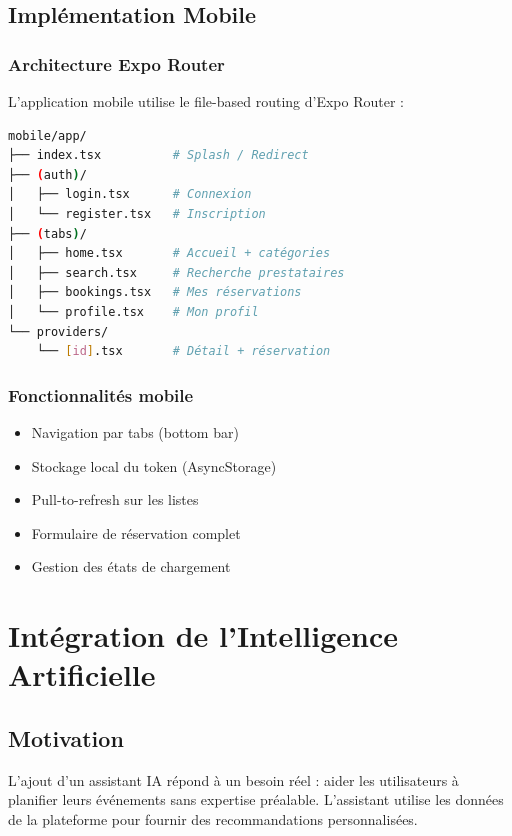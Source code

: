 \documentclass[12pt,a4paper]{report}
\begin{document}
\section{Implémentation Mobile}

\subsection{Architecture Expo Router}
L'application mobile utilise le file-based routing d'Expo Router :
\begin{lstlisting}[language=bash, caption=Structure des écrans mobile]
mobile/app/
├── index.tsx          # Splash / Redirect
├── (auth)/
│   ├── login.tsx      # Connexion
│   └── register.tsx   # Inscription
├── (tabs)/
│   ├── home.tsx       # Accueil + catégories
│   ├── search.tsx     # Recherche prestataires
│   ├── bookings.tsx   # Mes réservations
│   └── profile.tsx    # Mon profil
└── providers/
    └── [id].tsx       # Détail + réservation
\end{lstlisting}

\subsection{Fonctionnalités mobile}
\begin{itemize}
  \item Navigation par tabs (bottom bar)
  \item Stockage local du token (AsyncStorage)
  \item Pull-to-refresh sur les listes
  \item Formulaire de réservation complet
  \item Gestion des états de chargement
\end{itemize}

\chapter{Intégration de l'Intelligence Artificielle}

\section{Motivation}
L'ajout d'un assistant IA répond à un besoin réel : aider les utilisateurs à planifier leurs événements sans expertise préalable. L'assistant utilise les données de la plateforme pour fournir des recommandations personnalisées.
\end{document}
